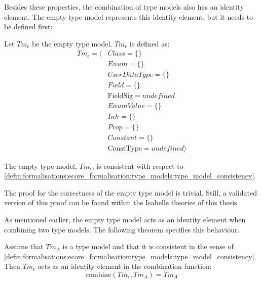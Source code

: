 Besides these properties, the combination of type models also has an identity element. The empty type model represents this identity element, but it needs to be defined first:

\begin{defin}
\label{defin:transformation_framework:type_models_and_type_graphs:combining_type_models:empty_type_model}
Let $Tm_{\epsilon}$ be the empty type model. $Tm_{\epsilon}$ is defined as:
\begin{align*}
Tm_{\epsilon} = \langle&
Class = \{\} \\&
Enum = \{\} \\&
UserDataType = \{\} \\&
Field = \{\} \\&
\mathrm{FieldSig} = undefined \\&
EnumValue = \{\} \\&
Inh = \{\} \\&
Prop = \{\} \\&
Constant = \{\} \\&
\mathrm{ConstType} = undefined\rangle
\end{align*}
\end{defin}

\begin{thm}
\label{defin:transformation_framework:type_models_and_type_graphs:combining_type_models:tmod_empty_correct}
The empty type model, $Tm_{\epsilon}$, is consistent with respect to
\cref{defin:formalisations:ecore_formalisation:type_models:type_model_consistency}.
\end{thm}

The proof for the correctness of the empty type model is trivial. Still, a validated version of this proof can be found within the Isabelle theories of this thesis.

As mentioned earlier, the empty type model acts as an identity element when combining two type models. The following theorem specifies this behaviour.

\begin{thm}
\label{defin:transformation_framework:type_models_and_type_graphs:combining_type_models:tmod_combine_identity}
Assume that $Tm_A$ is a type model and that it is consistent in the sense of \cref{defin:formalisations:ecore_formalisation:type_models:type_model_consistency}. Then $Tm_{\epsilon}$ acts as an identity element in the combination function:
\begin{equation*}
    \mathrm{combine}(Tm_{\epsilon}, Tm_A) = Tm_A
\end{equation*}
\end{thm}

